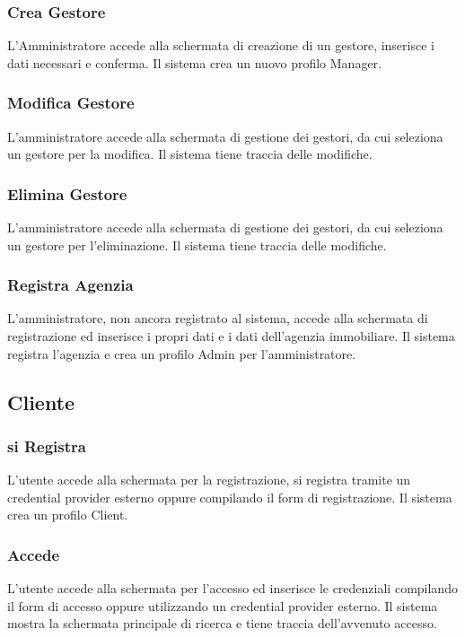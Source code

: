 \subsubsection{Crea Gestore}
L'Amministratore accede alla schermata di creazione di un gestore, 
inserisce i dati necessari e conferma. Il sistema crea un nuovo profilo Manager.

\subsubsection{Modifica Gestore}
L'amministratore accede alla schermata di gestione dei gestori, da cui 
seleziona un gestore per la modifica. Il sistema tiene traccia delle
modifiche.

\subsubsection{Elimina Gestore}
L'amministratore accede alla schermata di gestione dei gestori, da cui 
seleziona un gestore per l'eliminazione. Il sistema tiene traccia delle
modifiche.

\subsubsection{Registra Agenzia}
L'amministratore, non ancora registrato al sistema, accede alla schermata di registrazione 
ed inserisce i propri dati e i dati dell'agenzia immobiliare. Il sistema registra l'agenzia 
e crea un profilo Admin per l'amministratore.

\subsection{Cliente}
\subsubsection{si Registra}
L'utente accede alla schermata per la registrazione, si registra tramite 
un credential provider esterno oppure compilando il form di registrazione. 
Il sistema crea un profilo Client.

\subsubsection{Accede}
L'utente accede alla schermata per l'accesso ed inserisce le credenziali 
compilando il form di accesso oppure utilizzando un credential provider esterno. 
Il sistema mostra la schermata principale di ricerca e tiene traccia 
dell'avvenuto accesso.

